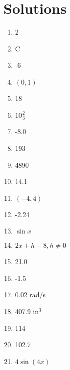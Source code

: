 \documentclass[../uilmath.tex]{subfiles}
\begin{document}
\section*{Solutions}
\begin{enumerate}[label=\bfseries\arabic*.]
    \item %
    2

    \item %
    C 

    \item %
    -6

    \item %
    $(0,1)$

    \item %
    18 

    \item %
    $10\frac{2}{3}$

    \item %
    -8.0

    \item %
    193

    \item %
    4890 

    \item %
    14.1

    \item %
    $(-4,4)$

    \item %
    -2.24

    \item %
    $\sin x$

    \item %
    $2x+h-8, h\neq 0$

    \item %
    21.0

    \item %
    -1.5

    \item %
    0.02 rad/s 

    \item %
    407.9 in$^3$

    \item %
    114

    \item %
    102.7

    \item %
    $4\sin(4x)$


\end{enumerate}
\end{document}
